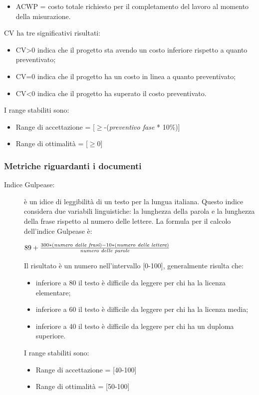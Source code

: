 \begin{description}
\begin{itemize}
        \item ACWP = costo totale richiesto per il completamento del lavoro al momento della misurazione.
      \end{itemize}
      CV ha tre significativi risultati:
      \begin{itemize}
        \item CV>0 indica che il progetto sta avendo un costo inferiore rispetto a quanto preventivato;
        \item CV=0 indica che il progetto ha un costo in linea a quanto preventivato;
        \item CV<0 indica che il progetto ha superato il costo preventivato.
      \end{itemize}
      I range stabiliti sono:
      \begin{itemize}
        \item Range di accettazione = [\(\geq\)-(\emph{preventivo fase} * 10\%)]
        \item Range di ottimalità = [\(\geq\)0]
      \end{itemize}
    \end{description}
    \subsubsection{Metriche riguardanti i documenti}
    \begin{description}
      \item[Indice Gulpease:] è un idice di leggibilità di un testo per la lungua italiana.
      Questo indice considera due variabili linguistiche: la lunghezza della parola e la lunghezza della frase rispetto al numero delle lettere.
      La formula per il calcolo dell'indice Gulpease è:
      \begin{center}
        \( 89+\frac{300 * (\emph{numero delle frasi}) - 10 * (\emph{numero delle lettere})}{\emph{numero delle parole}} \)
      \end{center}
      Il risultato è un numero nell'intervallo [0-100], generalmente risulta che:
      \begin{itemize}
        \item inferiore a 80 il testo è difficile da leggere per chi ha la licenza elementare;
        \item inferiore a 60 il testo è difficile da leggere per chi ha la licenza media;
        \item inferiore a 40 il testo è difficile da leggere per chi ha un duploma superiore.
      \end{itemize}
      I range stabiliti sono:
      \begin{itemize}
        \item Range di accettazione = [40-100]
        \item Range di ottimalità = [50-100]
      \end{itemize}
    \end{description}
